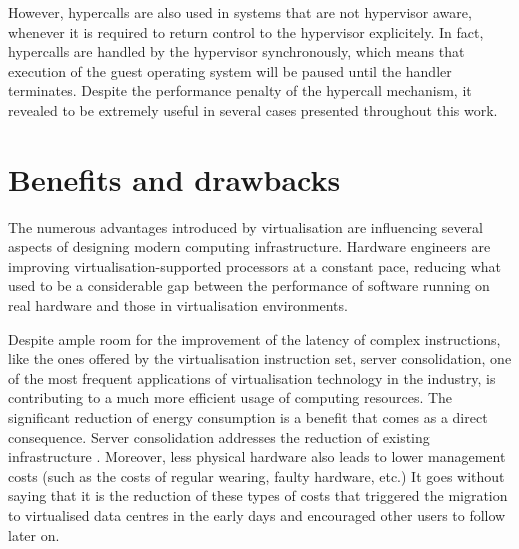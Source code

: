 However, hypercalls are also used in systems that are not hypervisor aware, whenever it is required to return control to the hypervisor explicitely. In fact, hypercalls are handled by the hypervisor synchronously, which means that execution of the guest operating system will be paused until the handler terminates.
Despite the performance penalty of the hypercall mechanism, it revealed to be extremely useful in several cases  presented throughout this work.



\section{Benefits and drawbacks}
The numerous advantages introduced by virtualisation are influencing several aspects of designing modern computing infrastructure. Hardware engineers are improving virtualisation-supported processors at a constant pace, reducing what used to be a considerable gap between the performance of software running on real hardware and those in virtualisation environments.%

Despite ample room for the improvement of the latency of complex instructions, like the ones offered by the virtualisation instruction set, server consolidation, one of the most frequent applications of virtualisation technology in the industry, is contributing to a much more efficient usage of computing resources. The significant reduction of energy consumption is a benefit that comes as a direct consequence. Server consolidation addresses the reduction of existing infrastructure \cite{consolidation}. Moreover, less physical hardware also leads to lower management costs (such as the costs of regular wearing, faulty hardware, etc.) 
It goes without saying that it is the reduction of these types of costs that triggered the migration to virtualised data centres in the early days and encouraged other users to follow later on.%

